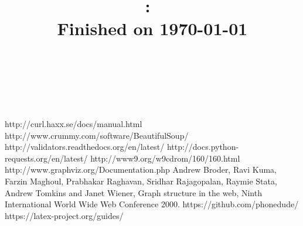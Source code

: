 \documentclass[letterpaper,12pt]{article}
\title{
\vspace{2in}
\textmd{\textbf{\Class:\ \AssignmentTitle}}\\
\normalsize\vspace{0.1in}\small{Finished on \today}\\
\vspace{0.1in}\large{\textit{\Instructor\ }}
\vspace{3in}
}
\author{\textbf{\MyName} \\ \MyEmail}
\date{}
\begin{document}
\begin{titlepage}
\clearpage\maketitle
\thispagestyle{empty}
\end{titlepage}


\newpage
\clearpage
\tableofcontents
\thispagestyle{empty}

\newpage



 
\newpage
\vspace*{10pt}

\begin{thebibliography}{9}
 http://curl.haxx.se/docs/manual.html
 http://www.crummy.com/software/BeautifulSoup/
http://validators.readthedocs.org/en/latest/
http://docs.python-requests.org/en/latest/
http://www9.org/w9cdrom/160/160.html
http://www.graphviz.org/Documentation.php
Andrew Broder, Ravi Kuma, Farzin Maghoul, Prabhakar Raghavan, Sridhar Rajagopalan, Raymie Stata, Andrew Tomkins and Janet Wiener, Graph structure in the web, Ninth International World Wide Web Conference 2000.
https://github.com/phonedude/
https://latex-project.org/guides/

 \end{thebibliography}
 
\end{document}
